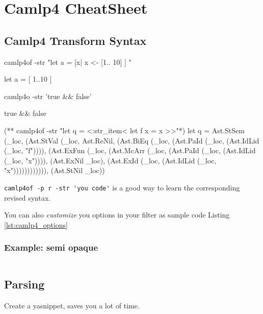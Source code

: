 \section{Camlp4 CheatSheet}

\subsection{Camlp4 Transform Syntax}

\begin{bashcode}
camlp4of -str "let a = [x| x <- [1.. 10] ] "
\end{bashcode}

\begin{ocamlcode}
 let a = [ 1..10 ]
\end{ocamlcode}




\begin{bashcode}
 camlp4o -str 'true && false'
\end{bashcode}

\begin{ocamlcode}
true && false
\end{ocamlcode}

\begin{ocamlcode}
(** camlp4of -str "let q = <:str_item< let f x = x >>"*)
let q =
  Ast.StSem (_loc,
    (Ast.StVal (_loc, Ast.ReNil,
       (Ast.BiEq (_loc,
          (Ast.PaId (_loc, (Ast.IdLid (_loc, "f")))),
          (Ast.ExFun (_loc,
             (Ast.McArr
                (_loc,
                (Ast.PaId (_loc, (Ast.IdLid (_loc, "x")))),
                (Ast.ExNil _loc), (Ast.ExId (_loc, (Ast.IdLid (_loc, "x")))))))))))),
    (Ast.StNil _loc))
\end{ocamlcode}

\verb|camlp4of -p r -str 'you code'| is a good way to learn the
corresponding revised syntax.

You can also \textit{customize} you options in your filter as sample
code Listing \ref{lst:camlp4_options}

\subsubsection{Example: semi opaque}
\inputminted[fontsize=\scriptsize]{ocaml}{code/camlp4/abstract/pa_abstract.ml}

\subsection{Parsing}
Create a yasnippet, saves you a lot of time.
